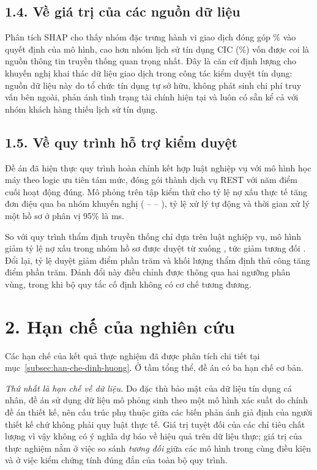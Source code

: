 \subsection*{1.4. Về giá trị của các nguồn dữ liệu}

Phân tích SHAP cho thấy nhóm đặc trưng hành vi giao dịch đóng góp
\ShapBehaviourPct{}\% vào quyết định của mô hình, cao hơn nhóm lịch sử tín dụng
CIC (\ShapCICPct{}\%) vốn được coi là nguồn thông tin truyền thống quan trọng
nhất. Đây là căn cứ định lượng cho khuyến nghị khai thác dữ liệu giao dịch trong
công tác kiểm duyệt tín dụng: nguồn dữ liệu này do tổ chức tín dụng tự sở hữu,
không phát sinh chi phí truy vấn bên ngoài, phản ánh tình trạng tài chính hiện
tại và luôn có sẵn kể cả với nhóm khách hàng thiếu lịch sử tín dụng.

\subsection*{1.5. Về quy trình hỗ trợ kiểm duyệt}

Đề án đã hiện thực quy trình hoàn chỉnh kết hợp \NRules{} luật nghiệp vụ với mô
hình học máy theo logic ưu tiên tám mức, đóng gói thành dịch vụ REST với năm điểm
cuối hoạt động đúng. Mô phỏng trên tập kiểm thử cho tỷ lệ nợ xấu thực tế tăng đơn
điệu qua ba nhóm khuyến nghị (\BadApprove{} -- \BadReview{} -- \BadReject{}), tỷ
lệ xử lý tự động \AutomationRate{} và thời gian xử lý một hồ sơ ở phân vị 95\% là
\SysPNinetyFive{} ms.

So với quy trình thẩm định truyền thống chỉ dựa trên luật nghiệp vụ, mô hình
giảm tỷ lệ nợ xấu trong nhóm hồ sơ được duyệt từ \TradBadRate{} xuống
\PropBadRate{}, tức giảm tương đối \BadRateReductionPct{}. Đổi lại, tỷ lệ duyệt
giảm \ApproveRateDrop{} điểm phần trăm và khối lượng thẩm định thủ công tăng
\ReviewRateRise{} điểm phần trăm. Đánh đổi này điều chỉnh được thông qua hai
ngưỡng phân vùng, trong khi bộ quy tắc cố định không có cơ chế tương đương.

\section*{2. Hạn chế của nghiên cứu}

Các hạn chế của kết quả thực nghiệm đã được phân tích chi tiết tại
mục~\ref{subsec:han-che-dinh-huong}. Ở tầm tổng thể, đề án có ba hạn chế cơ bản.

\textit{Thứ nhất là hạn chế về dữ liệu.} Do đặc thù bảo mật của dữ liệu tín dụng
cá nhân, đề án sử dụng dữ liệu mô phỏng sinh theo một mô hình xác suất do chính
đề án thiết kế, nên cấu trúc phụ thuộc giữa các biến phản ánh giả định của người
thiết kế chứ không phải quy luật thực tế. Giá trị tuyệt đối của các chỉ tiêu chất
lượng vì vậy không có ý nghĩa dự báo về hiệu quả trên dữ liệu thực; giá trị của
thực nghiệm nằm ở việc so sánh \textit{tương đối} giữa các mô hình trong cùng
điều kiện và ở việc kiểm chứng tính đúng đắn của toàn bộ quy trình.

